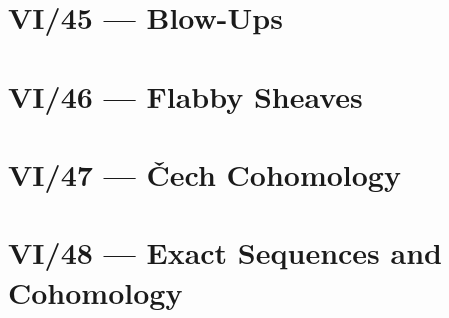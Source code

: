 




\section{VI/45 --- Blow-Ups}






\section{VI/46 --- Flabby Sheaves}






\section{VI/47 --- \v{C}ech Cohomology}






\section{VI/48 --- Exact Sequences and Cohomology}




